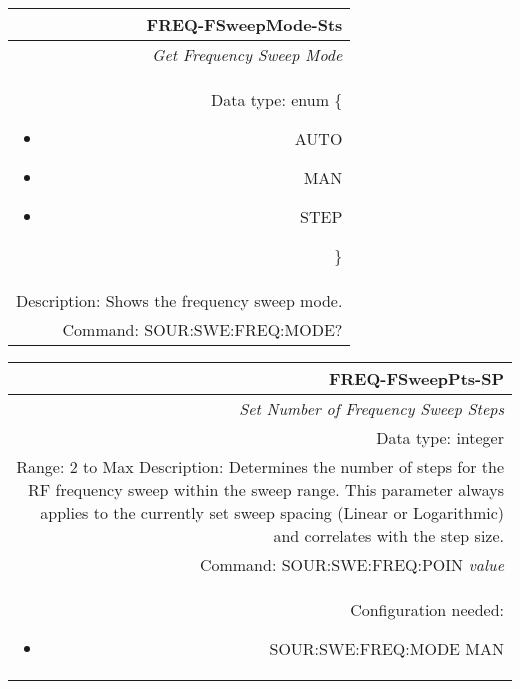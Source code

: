 \documentclass[openany]{article}
\begin{document}
		\begin{tabular}{N}
			\hline
			\bfseries FREQ-FSweepMode-Sts \\ \hline
			\emph{Get Frequency Sweep Mode} \\
			Data type: enum \{\begin{itemize}[noitemsep]
				\small
				\item[] AUTO
				\item[] MAN
				\item[] STEP
			\end{itemize}\} \\
			Description: Shows the frequency sweep mode. \\
			Command: SOUR:SWE:FREQ:MODE? \\

		\end{tabular}
%
		\begin{tabular}{N}
			\hline
			\bfseries FREQ-FSweepPts-SP \\ \hline
			\emph{Set Number of Frequency Sweep Steps} \\
			Data type: integer \\
			Range: 2 to Max
			Description: Determines the number of steps for the RF frequency sweep within the sweep range. This parameter always applies to the currently set sweep spacing (Linear or Logarithmic) and correlates with the step size. \\
			Command: SOUR:SWE:FREQ:POIN \emph{value} \\
			Configuration needed: \begin{itemize}[noitemsep]
				\small
				\item[] SOUR:SWE:FREQ:MODE MAN
			\end{itemize} \\
		
		\end{tabular}
\end{document}
